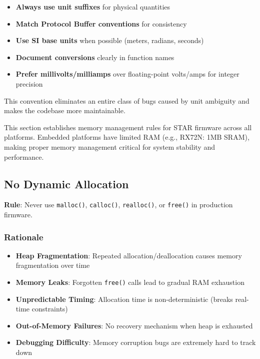 \begin{itemize}
\item \textbf{Always use unit suffixes} for physical quantities
\item \textbf{Match Protocol Buffer conventions} for consistency
\item \textbf{Use SI base units} when possible (meters, radians, seconds)
\item \textbf{Document conversions} clearly in function names
\item \textbf{Prefer millivolts/milliamps} over floating-point volts/amps for integer precision
\end{itemize}

This convention eliminates an entire class of bugs caused by unit ambiguity and makes the codebase more maintainable.


This section establishes memory management rules for STAR firmware across all platforms. Embedded platforms have limited RAM (e.g., RX72N: 1MB SRAM), making proper memory management critical for system stability and performance.

\subsection{No Dynamic Allocation}

\textbf{Rule}: Never use \texttt{malloc()}, \texttt{calloc()}, \texttt{realloc()}, or \texttt{free()} in production firmware.

\subsubsection{Rationale}

\begin{itemize}
  \item \textbf{Heap Fragmentation}: Repeated allocation/deallocation causes memory fragmentation over time
  \item \textbf{Memory Leaks}: Forgotten \texttt{free()} calls lead to gradual RAM exhaustion
  \item \textbf{Unpredictable Timing}: Allocation time is non-deterministic (breaks real-time constraints)
  \item \textbf{Out-of-Memory Failures}: No recovery mechanism when heap is exhausted
  \item \textbf{Debugging Difficulty}: Memory corruption bugs are extremely hard to track down
\end{itemize}

